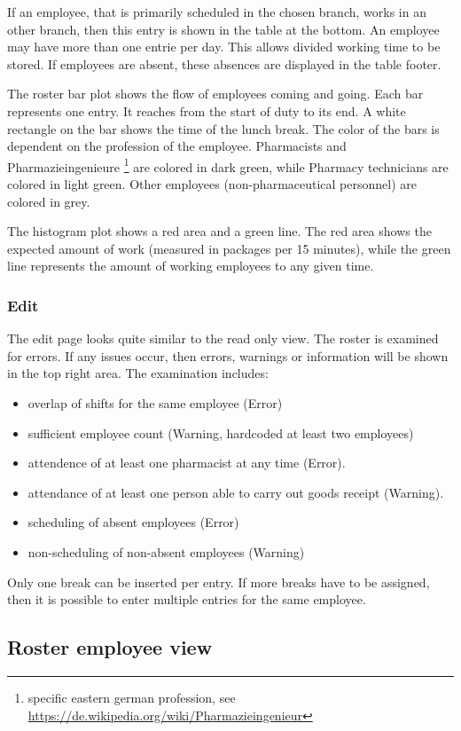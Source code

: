 If an employee, that is primarily scheduled in the chosen branch, works in an other branch, then this entry is shown in the table at the bottom.
An employee may have more than one entrie per day. This allows divided working time to be stored.
If employees are absent, these absences are displayed in the table footer.


The roster bar plot shows the flow of employees coming and going. Each bar represents one entry. It reaches from the start of duty to its end. A white rectangle on the bar shows the time of the lunch break. The color of the bars is dependent on the profession of the employee. Pharmacists and Pharmazieingenieure \footnote{specific eastern german profession, see \url{https://de.wikipedia.org/wiki/Pharmazieingenieur}} are colored in dark green, while Pharmacy technicians are colored in light green. Other employees (non-pharmaceutical personnel) are colored in grey.

The histogram plot shows a red area and a green line. The red area shows the expected amount of work (measured in packages per 15 minutes), while the green line represents the amount of working employees to any given time.


\subsubsection{Edit}
The edit page looks quite similar to the read only view. 
The roster is examined for errors. If any issues occur, then errors, warnings or information will be shown in the top right area.
The examination includes:
\begin{itemize}
    \item overlap of shifts for the same employee (Error)
    \item sufficient employee count (Warning, hardcoded at least two employees)
    \item attendence of at least one pharmacist at any time (Error).
    \item attendance of at least one person able to carry out goods receipt (Warning).
    \item scheduling of absent employees (Error)
    \item non-scheduling of non-absent employees (Warning)
\end{itemize}

Only one break can be inserted per entry. If more breaks have to be assigned, then it is possible to enter multiple entries for the same employee.
\subsection{Roster employee view}
